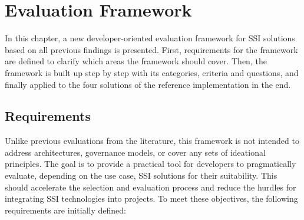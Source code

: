 \chapter{Evaluation Framework}\label{chapter: framework}
    
    In this chapter, a new developer-oriented evaluation framework for \ac{SSI} solutions based on all previous findings is presented. First, requirements for the framework are defined to clarify which areas the framework should cover. Then, the framework is built up step by step with its categories, criteria and questions, and finally applied to the four solutions of the reference implementation in the end. 
    
	\section{Requirements}\label{section: framework requirements}
	
	Unlike previous evaluations from the literature, this framework is not intended to address architectures, governance models, or cover any sets of ideational principles. The goal is to provide a practical tool for developers to pragmatically evaluate, depending on the use case, \ac{SSI} solutions for their suitability. This should accelerate the selection and evaluation process and reduce the hurdles for integrating \ac{SSI} technologies into projects. To meet these objectives, the following requirements are initially defined:
	
